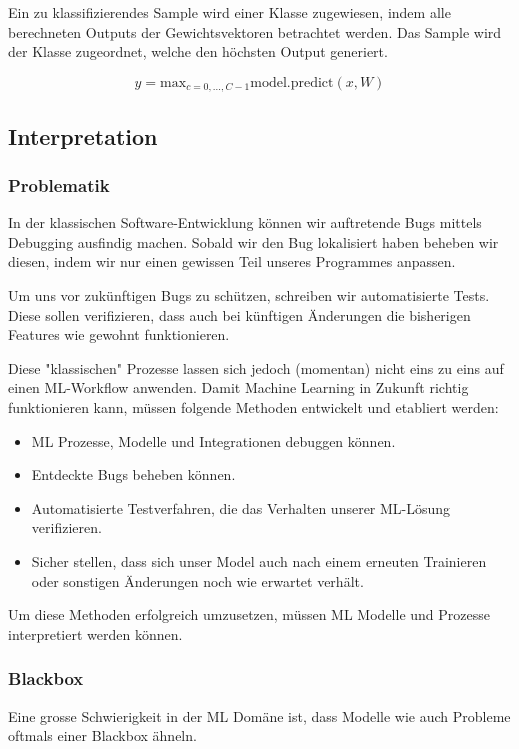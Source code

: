 Ein zu klassifizierendes Sample wird einer Klasse zugewiesen, indem alle berechneten Outputs der Gewichtsvektoren betrachtet werden. Das Sample wird der Klasse zugeordnet, welche den höchsten Output generiert.

$$ \hat{y} = \text{max}_{c=0,...,C-1} \text{model.predict}(x, W)$$

\newpage
\subsection{Interpretation}
\begin{flushleft}

\subsubsection{Problematik}
\begin{flushleft}

In der klassischen Software-Entwicklung können wir auftretende Bugs mittels Debugging ausfindig machen. Sobald wir den Bug lokalisiert haben beheben wir diesen, indem wir nur einen gewissen Teil unseres Programmes anpassen.

Um uns vor zukünftigen Bugs zu schützen, schreiben wir automatisierte Tests. Diese sollen verifizieren, dass auch bei künftigen Änderungen die bisherigen Features wie gewohnt funktionieren.

Diese "klassischen" Prozesse lassen sich jedoch (momentan) nicht eins zu eins auf einen ML-Workflow anwenden. Damit Machine Learning in Zukunft richtig funktionieren kann, müssen folgende Methoden entwickelt und etabliert werden:


\begin{itemize}
  \item ML Prozesse, Modelle und Integrationen debuggen können.
  \item Entdeckte Bugs beheben können.
  \item Automatisierte Testverfahren, die das Verhalten unserer ML-Lösung verifizieren.
  \item Sicher stellen, dass sich unser Model auch nach einem erneuten Trainieren oder sonstigen Änderungen noch wie erwartet verhält.
\end{itemize}

Um diese Methoden erfolgreich umzusetzen, müssen ML Modelle und Prozesse interpretiert werden können.

\end{flushleft}


\subsubsection{Blackbox}
\begin{flushleft}
Eine grosse Schwierigkeit in der ML Domäne ist, dass Modelle wie auch Probleme oftmals einer Blackbox ähneln.



\end{flushleft}
\end{flushleft}
